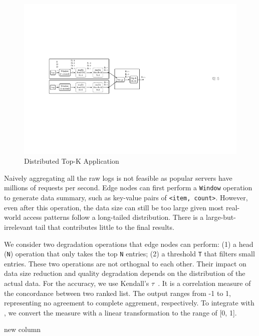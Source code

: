 \begin{figure}
  \centering
  \includegraphics[width=\columnwidth]{figures/topk.pdf}
  \caption{Distributed Top-K Application}
  \label{fig:topk}
\end{figure}

Naively aggregating all the raw logs is not feasible as popular servers have
millions of requests per second. Edge nodes can first perform a \texttt{Window}
operation to generate data summary, such as key-value pairs of \texttt{<item,
  count>}. However, even after this operation, the data size can still be too
large given most real-world access patterns follow a long-tailed
distribution. There is a large-but-irrelevant tail that contributes little to
the final results.

We consider two degradation operations that edge nodes can perform: (1) a head
(\texttt{N}) operation that only takes the top \texttt{N} entries; (2) a
threshold \texttt{T} that filters small entries. These two operations are not
orthognal to each other. Their impact on data size reduction and quality
degradation depends on the distribution of the actual data. For the accuracy, we
use Kendall's $\tau$~\cite{abdi2007kendall}. It is a correlation measure of the
concordance between two ranked list. The output ranges from -1 to 1,
representing no agreement to complete aggrement, respectively. To integrate with
\sysname{}, we convert the measure with a linear transformation to the range of
[0, 1].


\newpage

new column


